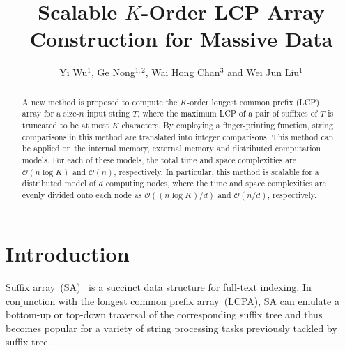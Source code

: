 \documentclass{llncs}
\begin{document}
\title{Scalable $K$-Order LCP Array Construction for Massive Data}

\author{Yi Wu$^1$, Ge Nong$^{1,2}$, Wai Hong Chan$^3$ and Wei Jun Liu$^1$}


\maketitle

\begin{abstract}
A new method is proposed to compute the $K$-order longest common prefix (LCP) array for a size-$n$ input string $T$, where the maximum LCP of a pair of suffixes of $T$ is truncated to be at most $K$ characters. By employing a finger-printing function, string comparisons in this method are translated into integer comparisons. This method can be applied on the internal memory, external memory and distributed computation models. For each of these models, the total time and space complexities are $\mathcal{O}(n\log K)$ and $\mathcal{O}(n)$, respectively. In particular, this method is scalable for a distributed model of $d$ computing nodes, where the time and space complexities are evenly divided onto each node as $\mathcal{O}((n\log K)/d)$ and $\mathcal{O}(n/d)$, respectively.
\end{abstract}

\section{Introduction}

Suffix array~(SA)~\cite{Manber1993} is a succinct data structure for full-text indexing. In conjunction with the longest common prefix array~(LCPA), SA can emulate a bottom-up or top-down traversal of the corresponding suffix tree and thus becomes popular for a variety of string processing tasks previously tackled by suffix tree~\cite{Abouelhodaa2004}.
\end{document}
